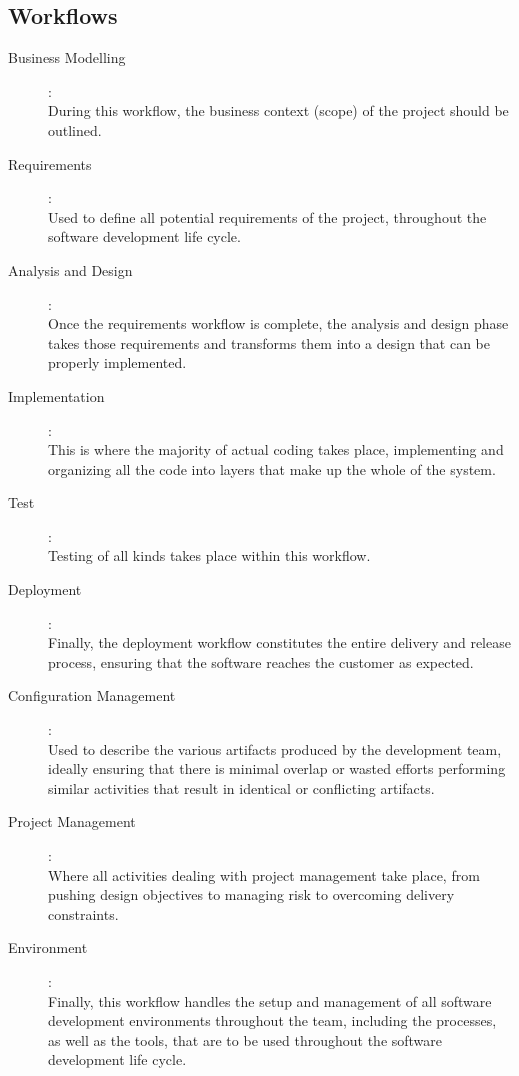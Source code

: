\begin{minipage}[t]{0.5\linewidth}
\subsection{Workflows}
\begin{description}
\item[Business Modelling]:\\
  During this workflow, the business context (scope) of the project should be
  outlined.
\item[Requirements]:\\
  Used to define all potential requirements of the project, throughout the
  software development life cycle.
\item[Analysis and Design]:\\
  Once the requirements workflow is complete, the analysis and design phase
  takes those requirements and transforms them into a design that can be
  properly implemented.
\item[Implementation]:\\
  This is where the majority of actual coding takes place, implementing and
  organizing all the code into layers that make up the whole of the system.
\item[Test]:\\
  Testing of all kinds takes place within this workflow.
\item[Deployment]:\\
  Finally, the deployment workflow constitutes the entire delivery and
  release process, ensuring that the software reaches the customer as expected.
\item[Configuration Management]:\\
Used to describe the various artifacts produced by the development team,
ideally ensuring that there is minimal overlap or wasted efforts performing
similar activities that result in identical or conflicting artifacts.
\item[Project Management]:\\
Where all activities dealing with project management take place, from pushing
design objectives to managing risk to overcoming delivery constraints.
\item[Environment]:\\
Finally, this workflow handles the setup and management of all software
development environments throughout the team, including the processes,
as well as the tools, that are to be used throughout the software
development life cycle.

\end{description}
\newpage

\end{minipage}
